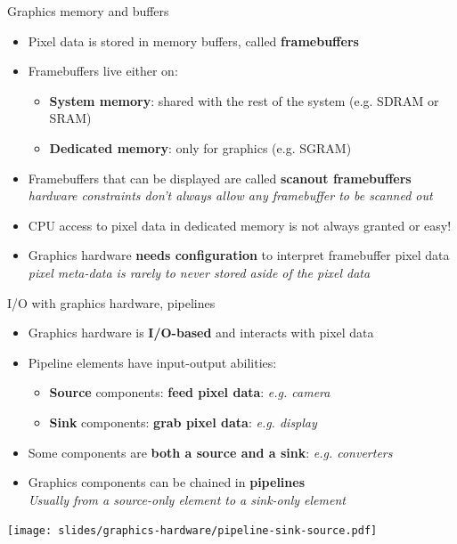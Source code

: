 \begin{frame}{Graphics memory and buffers}
  \begin{itemize}
  \item Pixel data is stored in memory buffers, called \textbf{framebuffers}
  \item Framebuffers live either on:
    \begin{itemize}
    \item \textbf{System memory}: shared with the rest of the system (e.g. SDRAM or SRAM)
    \item \textbf{Dedicated memory}: only for graphics (e.g. SGRAM)
    \end{itemize}
  \item Framebuffers that can be displayed are called \textbf{scanout framebuffers}\\
  \textit{hardware constraints don't always allow any framebuffer to be scanned out}
  \item CPU access to pixel data in dedicated memory is not always granted or easy!
  \item Graphics hardware \textbf{needs configuration} to interpret framebuffer pixel data\\
    \textit{pixel meta-data is rarely to never stored aside of the pixel data}
  \end{itemize}
\end{frame}

\begin{frame}{I/O with graphics hardware, pipelines}
  \begin{itemize}
  \item Graphics hardware is \textbf{I/O-based} and interacts with pixel data
  \item Pipeline elements have input-output abilities:
    \begin{itemize}
    \item \textbf{Source} components: \textbf{feed pixel data}: \textit{e.g. camera}
    \item \textbf{Sink} components: \textbf{grab pixel data}: \textit{e.g. display}
    \end{itemize}
  \item Some components are \textbf{both a source and a sink}: \textit{e.g. converters}
  \item Graphics components can be chained in \textbf{pipelines}\\
    \textit{Usually from a source-only element to a sink-only element}
  \end{itemize}

  \vspace{-2em}
  \begin{center}
  \texttt{[image: slides/graphics-hardware/pipeline-sink-source.pdf]}
  \end{center}
\end{frame}

